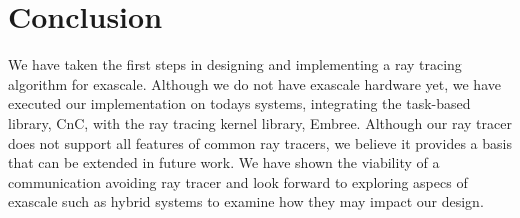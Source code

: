 \section{Conclusion}
\label{sec:conclusion}

We have taken the first steps in designing and implementing a ray tracing
algorithm for exascale.  Although we do not have exascale hardware yet, we have 
executed our implementation on todays systems, integrating the task-based 
library, CnC, with the ray tracing kernel library, Embree.  Although our ray 
tracer does not support all features of common ray tracers, we believe it 
provides a basis that can be extended in future work.  We have shown the
viability of a communication avoiding ray tracer and look forward to exploring 
aspecs of exascale such as hybrid systems to examine how they may impact our 
design.  
